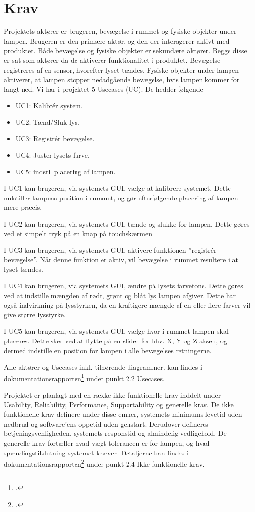 \chapter{Krav}

Projektets aktører er brugeren, bevægelse i rummet og fysiske objekter under lampen. Brugeren er den primære aktør, og den der interagerer aktivt med produktet. Både bevægelse og fysiske objekter er sekundære aktører. Begge disse er sat som aktører da de aktiverer funktionalitet i produktet. Bevægelse registreres af en sensor, hvorefter lyset tændes. Fysiske objekter under lampen aktiverer, at lampen stopper nedadgående bevægelse, hvis lampen kommer for langt ned.
Vi har i projektet 5 Usecases (UC). De hedder følgende:

\begin{itemize}
    \item UC1: Kalibrér system.
    \item UC2: Tænd/Sluk lys.
    \item UC3: Registrér bevægelse.
    \item UC4: Juster lysets farve.
    \item UC5: indstil placering af lampen.
\end{itemize}

I UC1 kan brugeren, via systemets GUI, vælge at kalibrere systemet. Dette nulstiller lampens position i rummet, og gør efterfølgende placering af lampen mere præcis.

I UC2 kan brugeren, via systemets GUI, tænde og slukke for lampen. Dette gøres ved et simpelt tryk på en knap på touchskærmen.

I UC3 kan brugeren, via systemets GUI, aktivere funktionen ”registrér bevægelse”. Når denne funktion er aktiv, vil bevægelse i rummet resultere i at lyset tændes.

I UC4 kan brugeren, via systemets GUI, ændre på lysets farvetone. Dette gøres ved at indstille mængden af rødt, grønt og blåt lys lampen afgiver. Dette har også indvirkning på lysstyrken, da en kraftigere mængde af en eller flere farver vil give større lysstyrke.

I UC5 kan brugeren, via systemets GUI, vælge hvor i rummet lampen skal placeres. Dette sker ved at flytte på en slider for hhv. X, Y og Z aksen, og dermed indstille en position for lampen i alle bevægelses retningerne.

Alle aktører og Usecases inkl. tilhørende diagrammer, kan findes i dokumentationsrapporten\footcite{documentation} under punkt 2.2 Usecases.

Projektet er planlagt med en række ikke funktionelle krav inddelt under Usability, Reliability, Performance, Supportability og generelle krav. De ikke funktionelle krav definere under disse emner, systemets minimums levetid uden nedbrud og software’ens oppetid uden genstart. Derudover defineres betjeningsvenligheden, systemets responstid og almindelig vedligehold. De generelle krav fortæller hvad vægt tolerancen er for lampen, og hvad spændingstilslutning systemet kræver. Detaljerne kan findes i dokumentationsrapporten\footcite{documentation} under punkt 2.4 Ikke-funktionelle krav. 
